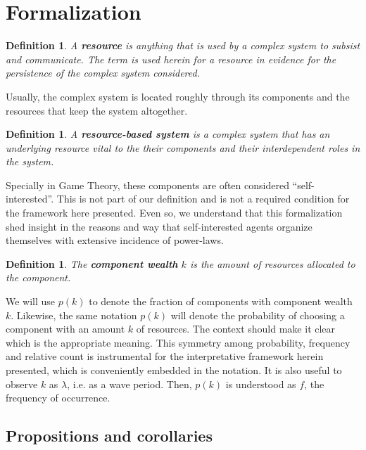 \documentclass[a4paper, 11pt]{article} %
\newtheorem{definition2}[theorem3]{Definition}
\begin{document}
\section{Formalization}\label{sec:form}

\begin{definition2}
	A {\bf resource} is anything that is used by a complex system to subsist and communicate. The term is used herein for a resource in evidence for the persistence of the complex system considered.
\end{definition2}

 Usually, the complex system is located roughly through its components and the resources that keep the system altogether.

\begin{definition2}
	A {\bf resource-based system} is a complex system that has an underlying resource vital to the their components and their interdependent roles in the system.
\end{definition2}

Specially in Game Theory, these components are often considered
``self-interested''. This is not part of our definition and
is not a required condition for the framework here presented.
Even so, we understand that this formalization shed insight
in the reasons and way that self-interested agents
organize themselves
with extensive incidence of power-laws.

\begin{definition2}
	The {\bf component wealth} $k$ is the amount of resources allocated to the component.
\end{definition2}

We will use $p(k)$ to denote the fraction of components with component wealth $k$. Likewise, the same notation $p(k)$ will denote the probability of choosing a component with an amount $k$ of resources.
The context should make it clear which is the appropriate meaning.
This symmetry among probability, frequency and relative count is
instrumental for the interpretative framework herein presented,
which is conveniently embedded in the notation.
It is also useful to observe 
$k$ as $\lambda$, i.e. as a wave period.
Then, $p(k)$ is understood as  $f$, the
frequency of occurrence.

\subsection{Propositions and corollaries}
\end{document}
